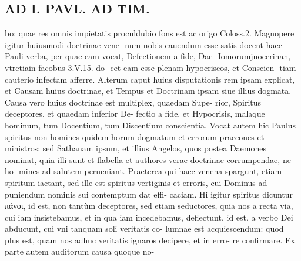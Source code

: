 \documentclass{article}
\begin{document}
\begin{pages}
\section*{AD I. PAVL. AD TIM. }
\marginpar{[ p.1o4 ]}\pstart bo: quae res omnis impietatis proculdubio fons est ac origo Coloss.2.  \pend\pstart Magnopere igitur huiusmodi doctrinae vene- num nobis cauendum esse satis docent haec Pauli verba, per quae eam vocat, Defectionem a fide, Dae- Iomorumjuocerinan, vtretiain facobus 3.V.15. do- cet eam esse plenam hypocriseos, et Conscien- tiam cauterio infectam afferre.  \pend\pstart Alterum caput huius disputationis rem ipsam explicat, et Causam huius doctrinae, et Tempus et Doctrinam ipsam siue illius dogmata. Causa vero huius doctrinae est multiplex, quaedam Supe- rior, Spiritus deceptores, et quaedam inferior De- fectio a fide, et Hypocrisis, malaque  hominum, tum Docentium, tum Discentium conscientia. Vocat autem hic Paulus spiritus non homines quidem horum dogmatum et errorum praecones et ministros: sed Sathanam ipsum, et illius Angelos, quos postea Daemones nominat, quia illi sunt et flabella et authores verae doctrinae corrumpendae, ne ho- mines ad salutem perueniant. Praeterea qui haec venena spargunt, etiam spiritum iactant, sed ille est spiritus vertiginis et erroris, cui Dominus ad puniendum nominis sui contemptum dat effi- caciam. Hi igitur spiritus dicuntur πάνοι, id est, non tantùm deceptores, sed etiam seductores, quia nos a recta via, cui iam insistebamus, et in qua iam incedebamus, deflectunt, id est, a verbo Dei abducunt, cui vni tanquam soli veritatis co- lumnae est acquiescendum: quod plus est, quam nos adhuc veritatis ignaros decipere, et in erro- re confirmare.  \pend\pstart Ex parte autem auditorum causa quoque no-  \pend

\end{pages}
\end{document}
